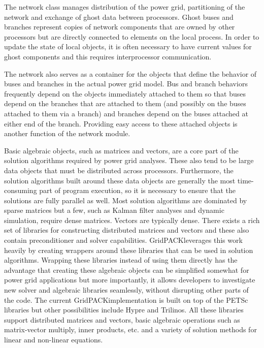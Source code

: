\documentclass[preprint]{acm_proc_article-sp}
\begin{document}
The network class manages distribution of the power grid, partitioning of the
network and exchange of ghost data between processors. Ghost buses and branches
represent copies of network components that are owned by other processors but
are directly connected to elements on the local process. In order to update
the state of local objects, it is often necessary to have current values for
ghost components and this requires interprocessor communication.

The network also serves as a container for the objects that define the behavior
of buses and branches in the actual power grid model. Bus and branch behaviors frequently
depend on the objects immediately attached to them so that buses depend on the
branches that are attached to them (and possibly on the buses attached to them
via a branch) and branches depend on the buses attached at either end of the
branch. Providing easy access to these attached objects is another function of the
network module.

Basic algebraic objects, such as matrices and vectors, are a core part
of the solution algorithms required by power grid analyses. These also tend to
be large data objects that must be distributed across processors. Furthermore,
the solution algorithms built around these data objects are generally the most
time-consuming part of program execution, so it is necessary to ensure that the
solutions are fully parallel as well. Most solution algorithms
are dominated by sparse matrices but a few, such as Kalman filter
analyses\cite{KAL} and dynamic simulation\cite{DS}, require dense
matrices. Vectors are typically dense. There exists a rich set of libraries for
constructing distributed matrices and vectors and these also contain preconditioner
and solver capabilities.  GridPACK\texttrademark leverages this work heavily by
creating wrappers around these libraries that can be used in solution
algorithms. Wrapping these libraries instead of using them directly has the
advantage that creating these algebraic objects can be simplified somewhat for power grid
applications but more importantly, it allows developers to investigate new
solver and algebraic libraries seamlessly, without disrupting other parts of the code.
The current GridPACK\texttrademark implementation is built on top of the
PETSc\cite{PETSC}
libraries but other possibilities include Hypre\cite{HYPRE} and
Trilinos\cite{TRIL}. All these
libraries support distributed matrices and vectors, basic algebraic operations
such as matrix-vector multiply, inner products, etc. and a variety of solution
methods for linear and non-linear equations.
\end{document}
